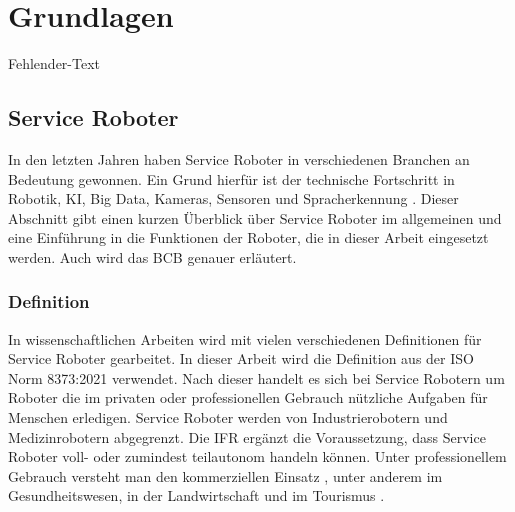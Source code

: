 \newpage
\section{Grundlagen}\label{Grundlagen}
Fehlender-Text

\subsection{Service Roboter}
In den letzten Jahren haben Service Roboter in verschiedenen Branchen an Bedeutung gewonnen. Ein Grund hierfür ist der technische Fortschritt in Robotik, KI, Big Data, Kameras, Sensoren und Spracherkennung \cite[S.~424]{Paluch2020}. Dieser Abschnitt gibt einen kurzen Überblick über Service Roboter im allgemeinen und eine Einführung in die Funktionen der Roboter, die in dieser Arbeit eingesetzt werden. Auch wird das \ac{BCB} genauer erläutert.

\subsubsection{Definition}
In wissenschaftlichen Arbeiten wird mit vielen verschiedenen Definitionen für Service Roboter gearbeitet. In dieser Arbeit wird die Definition aus der ISO Norm 8373:2021 \cite[Kap.~3]{ISO2021} verwendet. Nach dieser handelt es sich bei Service Robotern um Roboter die im privaten oder professionellen Gebrauch nützliche Aufgaben für Menschen erledigen. Service Roboter werden von Industrierobotern und Medizinrobotern abgegrenzt. Die \ac{IFR} \cite{IFR2024} ergänzt die Voraussetzung, dass Service Roboter voll- oder zumindest teilautonom handeln können. Unter professionellem Gebrauch versteht man den kommerziellen Einsatz \cite[S.~4]{GonzalezAguirre2021}, unter anderem im Gesundheitswesen, in der Landwirtschaft und im Tourismus \cite[S.~9]{GonzalezAguirre2021}.

